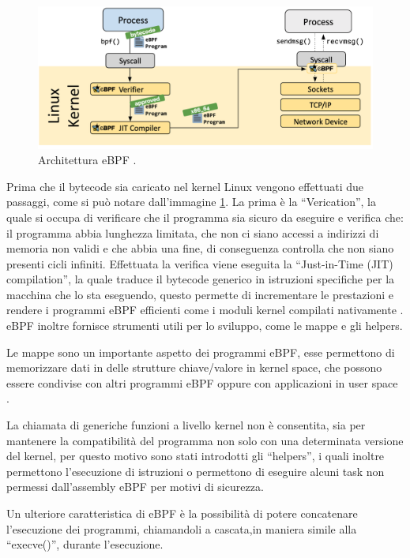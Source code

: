 \begin{figure}[]
    \label{fig:ebpf}
    \includegraphics[width=\hsize]{images/mitigazione/ebpf_architecture.png}
    \caption{Architettura eBPF \cite{ebpf.io}.}
    \centering
\end{figure}

Prima che il bytecode sia caricato nel kernel Linux vengono effettuati due passaggi, come si può notare dall'immagine \ref{fig:ebpf}. La prima è la ``Verication'', la quale si occupa di verificare che il programma sia sicuro da eseguire e verifica che: il programma abbia lunghezza limitata, che non ci siano accessi a indirizzi di memoria non validi e che abbia una fine, di conseguenza controlla che non siano presenti cicli infiniti. 
Effettuata la verifica viene eseguita la ``Just-in-Time (JIT) compilation'', la quale traduce il bytecode generico in istruzioni specifiche per la macchina che lo sta eseguendo, questo permette di incrementare le prestazioni e rendere i programmi eBPF efficienti come i moduli kernel compilati nativamente \cite{ebpf.io}.
eBPF inoltre fornisce strumenti utili per lo sviluppo, come le mappe e gli helpers.

Le mappe sono un importante aspetto dei programmi eBPF, esse permettono di memorizzare dati in delle strutture chiave/valore in kernel space, che possono essere condivise con altri programmi eBPF oppure con applicazioni in user space \cite{cilium_ebpf}.

La chiamata di generiche funzioni a livello kernel non è consentita, sia per mantenere la compatibilità del programma non solo con una determinata versione del kernel, per questo motivo sono stati introdotti gli ``helpers'', i quali inoltre permettono l'esecuzione di istruzioni o permettono di eseguire alcuni task non permessi dall'assembly eBPF per motivi di sicurezza.

Un ulteriore caratteristica di eBPF è la possibilità di potere concatenare l'esecuzione dei programmi, chiamandoli a cascata,in maniera simile alla ``execve()'', durante l'esecuzione.

